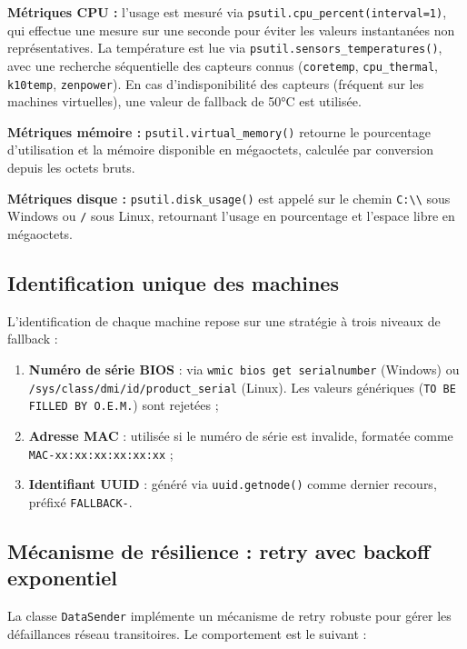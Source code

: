 \textbf{Métriques CPU :} l'usage est mesuré via \texttt{psutil.cpu\_percent(interval=1)},
qui effectue une mesure sur une seconde pour éviter les valeurs instantanées non
représentatives. La température est lue via \texttt{psutil.sensors\_temperatures()},
avec une recherche séquentielle des capteurs connus (\texttt{coretemp}, \texttt{cpu\_thermal},
\texttt{k10temp}, \texttt{zenpower}). En cas d'indisponibilité des capteurs (fréquent sur
les machines virtuelles), une valeur de fallback de 50°C est utilisée.

\textbf{Métriques mémoire :} \texttt{psutil.virtual\_memory()} retourne le pourcentage
d'utilisation et la mémoire disponible en mégaoctets, calculée par conversion depuis les
octets bruts.

\textbf{Métriques disque :} \texttt{psutil.disk\_usage()} est appelé sur le chemin
\texttt{C:\textbackslash\textbackslash} sous Windows ou \texttt{/} sous Linux, retournant
l'usage en pourcentage et l'espace libre en mégaoctets.

\subsection{Identification unique des machines}

L'identification de chaque machine repose sur une stratégie à trois niveaux de fallback :

\begin{enumerate}
  \item \textbf{Numéro de série BIOS} : via \texttt{wmic bios get serialnumber} (Windows)
        ou \texttt{/sys/class/dmi/id/product\_serial} (Linux). Les valeurs génériques
        (\texttt{TO BE FILLED BY O.E.M.}) sont rejetées ;
  \item \textbf{Adresse MAC} : utilisée si le numéro de série est invalide, formatée
        comme \texttt{MAC-xx:xx:xx:xx:xx:xx} ;
  \item \textbf{Identifiant UUID} : généré via \texttt{uuid.getnode()} comme dernier
        recours, préfixé \texttt{FALLBACK-}.
\end{enumerate}

\subsection{Mécanisme de résilience : retry avec backoff exponentiel}

La classe \texttt{DataSender} implémente un mécanisme de retry robuste pour gérer les
défaillances réseau transitoires. Le comportement est le suivant :

